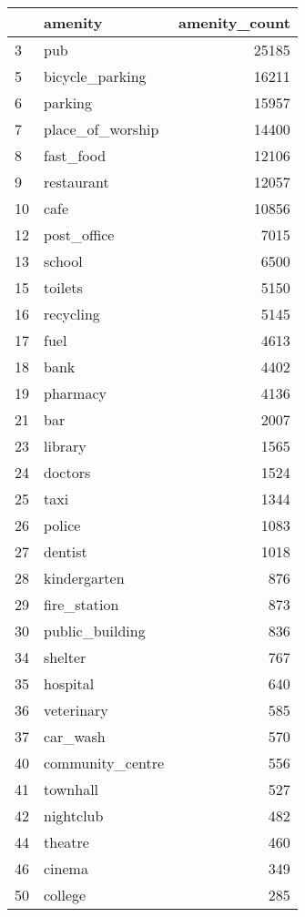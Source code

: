\begin{tabular}{llr}
\toprule
{} &           amenity &  amenity\_count \\
\midrule
3  &               pub &          25185 \\
5  &   bicycle\_parking &          16211 \\
6  &           parking &          15957 \\
7  &  place\_of\_worship &          14400 \\
8  &         fast\_food &          12106 \\
9  &        restaurant &          12057 \\
10 &              cafe &          10856 \\
12 &       post\_office &           7015 \\
13 &            school &           6500 \\
15 &           toilets &           5150 \\
16 &         recycling &           5145 \\
17 &              fuel &           4613 \\
18 &              bank &           4402 \\
19 &          pharmacy &           4136 \\
21 &               bar &           2007 \\
23 &           library &           1565 \\
24 &           doctors &           1524 \\
25 &              taxi &           1344 \\
26 &            police &           1083 \\
27 &           dentist &           1018 \\
28 &      kindergarten &            876 \\
29 &      fire\_station &            873 \\
30 &   public\_building &            836 \\
34 &           shelter &            767 \\
35 &          hospital &            640 \\
36 &        veterinary &            585 \\
37 &          car\_wash &            570 \\
40 &  community\_centre &            556 \\
41 &          townhall &            527 \\
42 &         nightclub &            482 \\
44 &           theatre &            460 \\
46 &            cinema &            349 \\
50 &           college &            285 \\
\bottomrule
\end{tabular}
